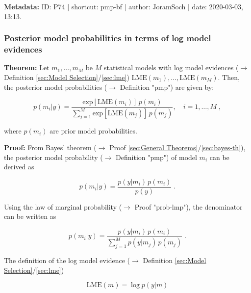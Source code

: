 \documentclass[a4paper,12pt]{book}
\begin{document}
\vspace{1em}
\textbf{Metadata:} ID: P74 | shortcut: pmp-bf | author: JoramSoch | date: 2020-03-03, 13:13.


\subsubsection[\textbf{Posterior model probabilities in terms of log model evidences}]{Posterior model probabilities in terms of log model evidences} \label{sec:pmp-lme}

\vspace{1em}
\textbf{Theorem:} Let $m_1, \ldots, m_M$ be $M$ statistical models with log model evidences ($\rightarrow$ Definition \ref{sec:Model Selection}/\ref{sec:lme}) $\mathrm{LME}(m_1), \ldots, \mathrm{LME}(m_M)$. Then, the posterior model probabilities ($\rightarrow$ Definition "pmp") are given by:

\begin{equation} \label{eq:pmp-lme-PMP-LME}
p(m_i|y) = \frac{\mathrm{exp}[\mathrm{LME}(m_i)] \, p(m_i)}{\sum_{j=1}^{M} \mathrm{exp}[\mathrm{LME}(m_j)] \, p(m_j)}, \quad i = 1,\ldots,M \; ,
\end{equation}

where $p(m_i)$ are prior model probabilities.


\vspace{1em}
\textbf{Proof:} From Bayes' theorem ($\rightarrow$ Proof \ref{sec:General Theorems}/\ref{sec:bayes-th}), the posterior model probability ($\rightarrow$ Definition "pmp") of model $m_i$ can be derived as

\begin{equation} \label{eq:pmp-lme-PMP-s1}
p(m_i|y) = \frac{p(y|m_i) \, p(m_i)}{p(y)} \; .
\end{equation}

Using the law of marginal probability ($\rightarrow$ Proof "prob-lmp"), the denominator can be written as

\begin{equation} \label{eq:pmp-lme-PMP-s2}
p(m_i|y) = \frac{p(y|m_i) \, p(m_i)}{\sum_{j=1}^{M} p(y|m_j) \, p(m_j)} \; .
\end{equation}

The definition of the log model evidence ($\rightarrow$ Definition \ref{sec:Model Selection}/\ref{sec:lme})

\begin{equation} \label{eq:pmp-lme-LME}
\mathrm{LME}(m) = \log p(y|m)
\end{equation}
\end{document}
